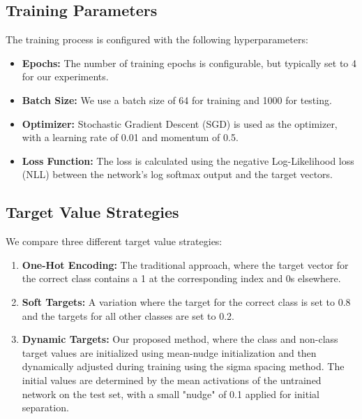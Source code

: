 \documentclass[12pt,fleqn,a4paper]{article}
\begin{document}
 \subsection{Training Parameters}
 The training process is configured with the following hyperparameters:
 \begin{itemize}
     \item \textbf{Epochs:} The number of training epochs is configurable, but typically set to 4 for our experiments.
     \item \textbf{Batch Size:} We use a batch size of 64 for training and 1000 for testing.
     \item \textbf{Optimizer:} Stochastic Gradient Descent (SGD) is used as the optimizer, with a learning rate of 0.01 and momentum of 0.5.
     \item \textbf{Loss Function:} The loss is calculated using the negative Log-Likelihood loss (NLL) between the network's log softmax output and the target vectors.
 \end{itemize}

 \subsection{Target Value Strategies}
 We compare three different target value strategies:
 \begin{enumerate}
     \item \textbf{One-Hot Encoding:} The traditional approach, where the target vector for the correct class contains a 1 at the corresponding index and 0s elsewhere.
     \item \textbf{Soft Targets:} A variation where the target for the correct class is set to 0.8 and the targets for all other classes are set to 0.2.
     \item \textbf{Dynamic Targets:} Our proposed method, where the class and non-class target values are initialized using mean-nudge initialization and then dynamically adjusted during training using the sigma spacing method. The initial values are determined by the mean activations of the untrained network on the test set, with a small "nudge" of 0.1 applied for initial separation.
 \end{enumerate}
\end{document}
